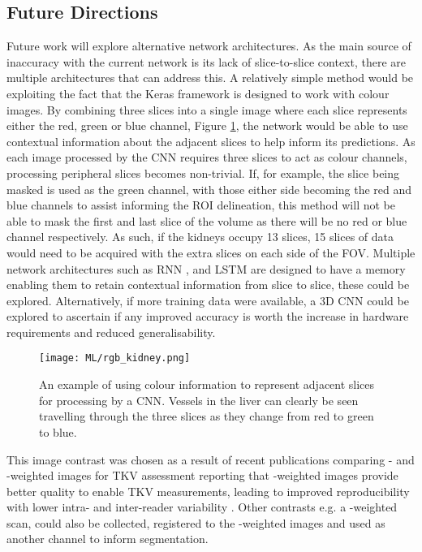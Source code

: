 \subsection{Future Directions}

Future work will explore alternative network architectures. As the main source of inaccuracy with the current network is its lack of slice-to-slice context, there are multiple architectures that can address this. A relatively simple method would be exploiting the fact that the Keras framework is designed to work with colour images. By combining three slices into a single image where each slice represents either the red, green or blue channel, Figure \ref{fig:ml_rgb_slices}, the network would be able to use contextual information about the adjacent slices to help inform its predictions. As each image processed by the \ac{CNN} requires three slices to act as colour channels, processing peripheral slices becomes non-trivial. If, for example, the slice being masked is used as the green channel, with those either side becoming the red and blue channels to assist informing the \ac{ROI} delineation, this method will not be able to mask the first and last slice of the volume as there will be no red or blue channel respectively. As such, if the kidneys occupy 13 slices, 15 slices of data would need to be acquired with the extra slices on each side of the \ac{FOV}. Multiple network architectures such as \ac{RNN} \cite{chen_combining_2016}, and \ac{LSTM} \cite{stollenga_parallel_2015} are designed to have a memory enabling them to retain contextual information from slice to slice, these could be explored. Alternatively, if more training data were available, a 3D \ac{CNN} could be explored to ascertain if any improved accuracy is worth the increase in hardware requirements and reduced generalisability.
 
\begin{figure}[H]
	\centering
	\texttt{[image: ML/rgb\_kidney.png]}
	\caption{An example of using colour information to represent adjacent slices for processing by a \ac{CNN}. Vessels in the liver can clearly be seen travelling through the three slices as they change from red to green to blue.}
	\label{fig:ml_rgb_slices}	
\end{figure}

This image contrast was chosen as a result of recent publications comparing \tone- and \ttwo-weighted images for \ac{TKV} assessment reporting that \ttwo-weighted images provide better quality to enable \ac{TKV} measurements, leading to improved reproducibility with lower intra- and inter-reader variability \cite{van_gastel_t1_2018}. Other contrasts e.g. a \tone-weighted scan, could also be collected, registered to the \ttwo-weighted images and used as another channel to inform segmentation.

